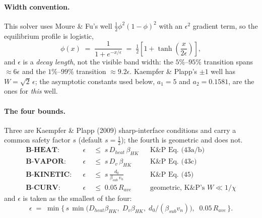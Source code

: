 %

\paragraph{Width convention.}
This solver uses Moure \& Fu's well $\tfrac12\phi^2(1-\phi)^2$ with an
$\epsilon^2$ gradient term, so the equilibrium profile is logistic,
%
\begin{equation}
  \phi(x) \;=\; \frac{1}{1+e^{-x/\epsilon}}
          \;=\; \tfrac12\left[1+\tanh\!\left(\frac{x}{2\epsilon}\right)\right],
  \label{eq:profile}
\end{equation}
%
and $\epsilon$ is a \emph{decay length}, not the visible band width: the
$5\%$--$95\%$ transition spans $\approx 6\epsilon$ and the $1\%$--$99\%$
transition $\approx 9.2\epsilon$. Kaempfer \& Plapp's $\pm1$ well has
$W = \sqrt{2}\,\epsilon$; the asymptotic constants used below,
$a_1 = 5$ and $a_2 = 0.1581$, are the ones for \emph{this} well.

\paragraph{The four bounds.}
Three are Kaempfer \& Plapp (2009) sharp-interface conditions and carry a
common safety factor $s$ (default $s = \tfrac12$); the fourth is geometric
and does not.
%
\begin{align}
  \textbf{B-HEAT:}    &&  \epsilon &\;\le\; s\,D_{heat}\,\beta_{HK}
    && \text{K\&P Eq.\ (43a/b)} \label{eq:bheat}\\[2pt]
  \textbf{B-VAPOR:}   &&  \epsilon &\;\le\; s\,D_v\,\beta_{HK}
    && \text{K\&P Eq.\ (43c)} \label{eq:bvapor}\\[2pt]
  \textbf{B-KINETIC:} &&  \epsilon &\;\le\; s\,\frac{d_0}{\beta_{sub}\,v_n}
    && \text{K\&P Eq.\ (45)} \label{eq:bkinetic}\\[2pt]
  \textbf{B-CURV:}    &&  \epsilon &\;\le\; 0.05\,R_{ave}
    && \text{geometric, K\&P's } W \ll 1/\chi \label{eq:bcurv}
\end{align}
%
and $\epsilon$ is taken as the smallest of the four:
%
\begin{equation}
  \epsilon \;=\; \min\Big\{\,
      s\,\min\big(D_{heat}\beta_{HK},\; D_v\beta_{HK},\;
                  d_0/(\beta_{sub}v_n)\big),\;\; 0.05\,R_{ave}\,\Big\}.
  \label{eq:epsdef}
\end{equation}

